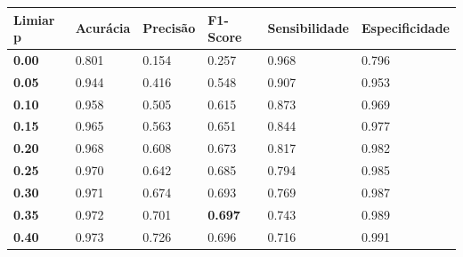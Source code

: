 \begin{table}
\center
\begin{tiny}
\begin{tabular}{|l|l|l|l|l|l|}
\hline
\rowcolor[HTML]{C0C0C0} 
\textbf{Limiar p}                    & \textbf{Acurácia}     & \textbf{Precisão}   & \textbf{F1-Score}         & \textbf{Sensibilidade}   & \textbf{Especificidade}     \\ \hline
\cellcolor[HTML]{EFEFEF}\textbf{0.00}   & 0.801                 & 0.154               & 0.257                     & 0.968                    & 0.796                       \\ \cline{1-6}
\cellcolor[HTML]{EFEFEF}\textbf{0.05}   & 0.944                 & 0.416               & 0.548                     & 0.907                    & 0.953                       \\ \cline{1-6}
\cellcolor[HTML]{EFEFEF}\textbf{0.10}   & 0.958                 & 0.505               & 0.615                     & 0.873                    & 0.969                       \\ \cline{1-6}
\cellcolor[HTML]{EFEFEF}\textbf{0.15}   & 0.965                 & 0.563               & 0.651                     & 0.844                    & 0.977                       \\ \cline{1-6} 
\cellcolor[HTML]{EFEFEF}\textbf{0.20}   & 0.968                 & 0.608               & 0.673                     & 0.817                    & 0.982                       \\ \cline{1-6}
\cellcolor[HTML]{EFEFEF}\textbf{0.25}   & 0.970                 & 0.642               & 0.685                     & 0.794                    & 0.985                       \\ \cline{1-6}
\cellcolor[HTML]{EFEFEF}\textbf{0.30}   & 0.971                 & 0.674               & 0.693                     & 0.769                    & 0.987                       \\ \cline{1-6}
\rowcolor[HTML]{D0D0D0}\textbf{0.35}   & 0.972                 & 0.701               & \textbf{0.697}             & 0.743                    & 0.989                       \\ \cline{1-6} 
\cellcolor[HTML]{EFEFEF}\textbf{0.40}   & 0.973                 & 0.726               & 0.696                     & 0.716                    & 0.991                       \\ \cline{1-6}

\end{tabular}
\end{tiny}
\end{table}
